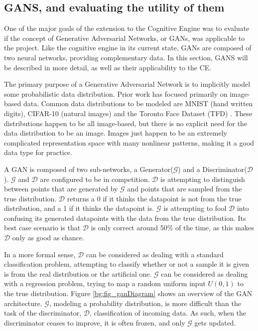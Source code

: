 	\subsection {GANS, and evaluating the utility of them}
	\par One of the major goals of the extension to the Cognitive Engine was to evaluate if the concept of Generative Adversarial Networks, or GANs, was applicable to the project. Like the cognitive engine in its current state, GANs are composed of two neural networks, providing complementary data. In this section, GANS will be described in more detail, as well as their applicability to the CE.  
	\par The primary purpose of a Generative Adversarial Network is to implicitly model some probabilistic data distribution. Prior work has focused primarily on image-based data. Common data distributions to be modeled are MNIST (hand written digits), CIFAR-10 (natural images) and the Toronto Face Dataset (TFD) \cite{gan_overview}. These distributions happen to be all image-based, but there is no explicit need for the data distribution to be an image. Images just happen to be an extremely complicated representation space with many nonlinear patterns, making it a good data type for practice.
	\par A GAN is composed of two sub-networks, a Generator($\mathcal{G}$) and a Discriminator($\mathcal{D}$). $\mathcal{G}$ and $\mathcal{D}$ are configured to be in competition. $\mathcal{D}$ is attempting to distinguish between points that are generated by $\mathcal{G}$ and points that are sampled from the true distribution. $\mathcal{D}$ returns a 0 if it thinks the datapoint is not from the true distribution, and a 1 if it thinks the datapoint is. $\mathcal{G}$ is attempting to fool $\mathcal{D}$ into confusing its generated datapoints with the data from the true distribution. Its best case scenario is that $\mathcal{D}$ is only correct around 50\% of the time, as this makes $\mathcal{D}$ only as good as chance.
	\par In a more formal sense, $\mathcal{D}$ can be considered as dealing with a standard classification problem, attempting to classify whether or not a sample it is given is from the real distribution or the artificial one. $\mathcal{G}$ can be considered as dealing with a regression problem, trying to map a random uniform input $U(0,1)$ to the true distribution. Figure \ref{bg:fig_ganDiagram} shows an overview of the GAN architecture. $\mathcal{G}$, modeling a probability distribution, is more difficult than the task of the discriminator, $\mathcal{D}$, classification of incoming data. As such, when the discriminator ceases to improve, it is often frozen, and only $\mathcal{G}$ gets updated. 
